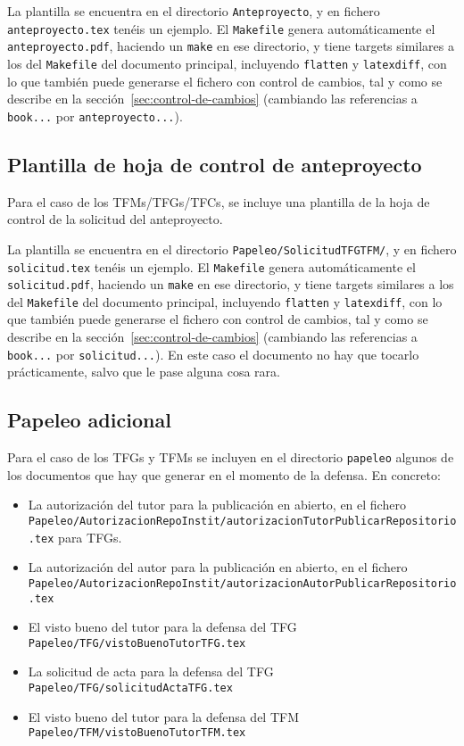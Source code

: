 La plantilla se encuentra en el directorio \texttt{Anteproyecto}, y en
fichero \texttt{anteproyecto.tex} tenéis un ejemplo. El
\texttt{Makefile} genera automáticamente el \texttt{anteproyecto.pdf},
haciendo un \texttt{make} en ese directorio, y tiene targets similares a los
del \texttt{Makefile} del documento principal, incluyendo
\texttt{flatten} y \texttt{latexdiff}, con lo que también puede
generarse el fichero con control de cambios, tal y como se describe en
la sección~\ref{sec:control-de-cambios} (cambiando las referencias a
\texttt{book...} por \texttt{anteproyecto...}).

\subsection{Plantilla de hoja de control de anteproyecto}
\label{sec:plantilla-de-hoja-control-anteproyecto}

Para el caso de los TFMs/TFGs/TFCs, se incluye una plantilla de la hoja
de control de la solicitud del anteproyecto.

La plantilla se encuentra en el directorio \texttt{Papeleo/SolicitudTFGTFM/}, y en
fichero \texttt{solicitud.tex} tenéis un ejemplo. El
\texttt{Makefile} genera automáticamente el \texttt{solicitud.pdf},
haciendo un \texttt{make} en ese directorio, y tiene targets similares a los
del \texttt{Makefile} del documento principal, incluyendo
\texttt{flatten} y \texttt{latexdiff}, con lo que también puede
generarse el fichero con control de cambios, tal y como se describe en
la sección~\ref{sec:control-de-cambios} (cambiando las referencias a
\texttt{book...} por \texttt{solicitud...}). En este caso el documento
no hay que tocarlo prácticamente, salvo que le pase alguna cosa rara.


\subsection{Papeleo adicional}
\label{sec:introapp1}

Para el caso de los TFGs y TFMs se incluyen en el directorio
\texttt{papeleo} algunos de los documentos que hay que generar en el
momento de la defensa. En concreto:

\begin{itemize}
\item La autorización del tutor para la publicación en abierto, en el
  fichero
  \texttt{Papeleo/AutorizacionRepoInstit/autorizacionTutorPublicarRepositorio.tex}
  para TFGs.
\item La autorización del autor para la publicación en abierto, en el
  fichero
  \texttt{Papeleo/AutorizacionRepoInstit/autorizacionAutorPublicarRepositorio.tex}
\item El visto bueno del tutor para la defensa del TFG
  \texttt{Papeleo/TFG/vistoBuenoTutorTFG.tex}
\item La solicitud de acta para la defensa del TFG
  \texttt{Papeleo/TFG/solicitudActaTFG.tex}
\item El visto bueno del tutor para la defensa del TFM
  \texttt{Papeleo/TFM/vistoBuenoTutorTFM.tex}
\end{itemize}

